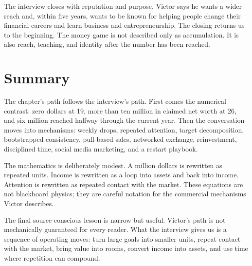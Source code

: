 The interview closes with reputation and purpose. Victor says he wants a wider reach and, within five years, wants to be known for helping people change their financial careers and learn business and entrepreneurship. The closing returns us to the beginning. The money game is not described only as accumulation. It is also reach, teaching, and identity after the number has been reached.

\section{Summary}

The chapter's path follows the interview's path. First comes the numerical contrast: zero dollars at 19, more than ten million in claimed net worth at 26, and six million reached halfway through the current year. Then the conversation moves into mechanisms: weekly drops, repeated attention, target decomposition, bootstrapped consistency, pull-based sales, networked exchange, reinvestment, disciplined time, social media marketing, and a restart playbook.

The mathematics is deliberately modest. A million dollars is rewritten as repeated units. Income is rewritten as a loop into assets and back into income. Attention is rewritten as repeated contact with the market. These equations are not blackboard physics; they are careful notation for the commercial mechanisms Victor describes.

The final source-conscious lesson is narrow but useful. Victor's path is not mechanically guaranteed for every reader. What the interview gives us is a sequence of operating moves: turn large goals into smaller units, repeat contact with the market, bring value into rooms, convert income into assets, and use time where repetition can compound.
